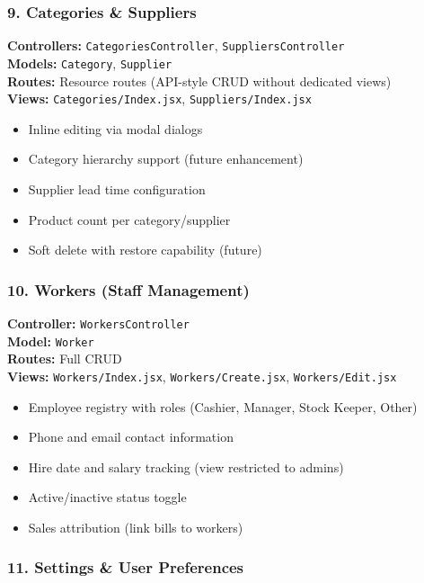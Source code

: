 \subsubsection{9. Categories \& Suppliers}

\textbf{Controllers:} \texttt{CategoriesController}, \texttt{SuppliersController}\\
\textbf{Models:} \texttt{Category}, \texttt{Supplier}\\
\textbf{Routes:} Resource routes (API-style CRUD without dedicated views)\\
\textbf{Views:} \texttt{Categories/Index.jsx}, \texttt{Suppliers/Index.jsx}

\begin{itemize}
    \item Inline editing via modal dialogs
    \item Category hierarchy support (future enhancement)
    \item Supplier lead time configuration
    \item Product count per category/supplier
    \item Soft delete with restore capability (future)
\end{itemize}

\subsubsection{10. Workers (Staff Management)}

\textbf{Controller:} \texttt{WorkersController}\\
\textbf{Model:} \texttt{Worker}\\
\textbf{Routes:} Full CRUD\\
\textbf{Views:} \texttt{Workers/Index.jsx}, \texttt{Workers/Create.jsx}, \texttt{Workers/Edit.jsx}

\begin{itemize}
    \item Employee registry with roles (Cashier, Manager, Stock Keeper, Other)
    \item Phone and email contact information
    \item Hire date and salary tracking (view restricted to admins)
    \item Active/inactive status toggle
    \item Sales attribution (link bills to workers)
\end{itemize}

\subsubsection{11. Settings \& User Preferences}

